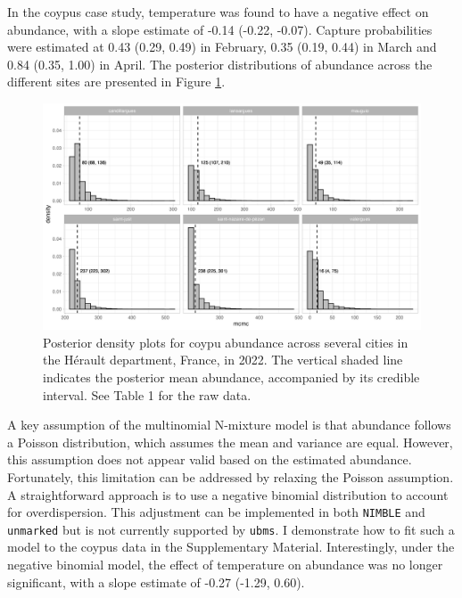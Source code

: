 \documentclass[
  11pt,
  a4paper,
]{article}
\begin{document}
In the coypus case study, temperature was found to have a negative effect on abundance, with a slope estimate of -0.14 (-0.22, -0.07). Capture probabilities were estimated at 0.43 (0.29, 0.49) in February, 0.35 (0.19, 0.44) in March and 0.84 (0.35, 1.00) in April. The posterior distributions of abundance across the different sites are presented in Figure \ref{fig:pdcoypus}.

\begin{figure}[H]

{\centering \includegraphics[width=0.98\linewidth]{hist_coypus} 

}

\caption{Posterior density plots for coypu abundance across several cities in the Hérault department, France, in 2022. The vertical shaded line indicates the posterior mean abundance, accompanied by its credible interval. See Table 1 for the raw data.}\label{fig:pdcoypus}
\end{figure}

A key assumption of the multinomial N-mixture model is that abundance follows a Poisson distribution, which assumes the mean and variance are equal. However, this assumption does not appear valid based on the estimated abundance. Fortunately, this limitation can be addressed by relaxing the Poisson assumption. A straightforward approach is to use a negative binomial distribution to account for overdispersion. This adjustment can be implemented in both \texttt{NIMBLE} and \texttt{unmarked} but is not currently supported by \texttt{ubms}. I demonstrate how to fit such a model to the coypus data in the Supplementary Material. Interestingly, under the negative binomial model, the effect of temperature on abundance was no longer significant, with a slope estimate of -0.27 (-1.29, 0.60).
\end{document}
